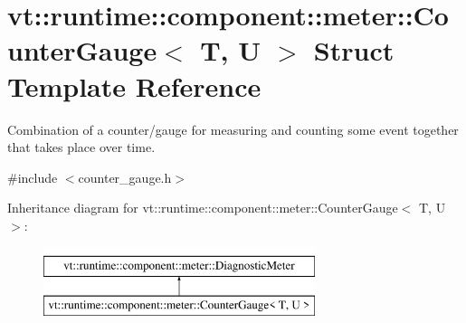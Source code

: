 \hypertarget{structvt_1_1runtime_1_1component_1_1meter_1_1_counter_gauge}{}\section{vt\+:\+:runtime\+:\+:component\+:\+:meter\+:\+:Counter\+Gauge$<$ T, U $>$ Struct Template Reference}
\label{structvt_1_1runtime_1_1component_1_1meter_1_1_counter_gauge}


Combination of a counter/gauge for measuring and counting some event together that takes place over time.  




{\ttfamily \#include $<$counter\+\_\+gauge.\+h$>$}

Inheritance diagram for vt\+:\+:runtime\+:\+:component\+:\+:meter\+:\+:Counter\+Gauge$<$ T, U $>$\+:\begin{figure}[H]
\begin{center}
\leavevmode
\includegraphics[height=2.000000cm]{structvt_1_1runtime_1_1component_1_1meter_1_1_counter_gauge}
\end{center}
\end{figure}
